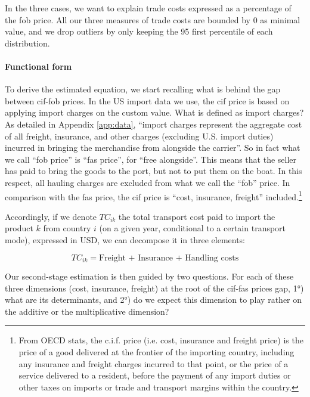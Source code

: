 \documentclass[a4paper,11pt]{article}
\begin{document}
In the three cases, we want to explain trade costs expressed as a percentage of the fob price. All our three measures of trade costs are bounded by 0 as minimal value, and we drop outliers by only keeping the 95 first percentile of each distribution.
\bigskip

\paragraph{Functional form} To derive the estimated equation, we start recalling what is behind the gap between cif-fob prices. In the US import data we use, the cif price is based on applying import charges on the custom value. What is defined as import charges? As detailed in Appendix \ref{app:data}, ``import charges represent the aggregate cost of all freight, insurance, and other charges (excluding U.S. import duties) incurred in bringing the merchandise from alongside the carrier''. So in fact what we call ``fob price'' is ``fas price'', for ``free alongside''. This means that the seller has paid to bring the goods to the port, but not to put them on the boat. In this respect, all hauling charges are excluded from what we call the ``fob'' price. In comparison with the fas price, the cif price is ``cost, insurance, freight'' included.\footnote{From OECD stats, the c.i.f. price (i.e. cost, insurance and freight price) is the price of a good delivered at the frontier of the importing country, including any insurance and freight charges incurred to that point, or the price of a service delivered to a resident, before the payment of any import duties or other taxes on imports or trade and transport margins within the country.}

Accordingly, if we denote $TC_{ik}$ the total transport cost paid to import the product $k$ from country $i$ (on a given year, conditional to a certain transport mode), expressed in USD, we can decompose it in three elements:

$$TC_{ik} = \text{Freight + Insurance + Handling costs}$$

Our second-stage estimation is then guided by two questions. For each of these three dimensions (cost, insurance, freight) at the root of the cif-fas prices gap, 1°) what are its determinants, and 2°) do we expect this dimension to play rather on the additive or the multiplicative dimension?
\end{document}
